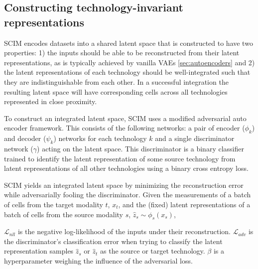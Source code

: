 \subsection{Constructing technology-invariant representations}
SCIM encodes datasets into a shared latent space that is constructed to have two properties:
1) the inputs should be able to be reconstructed from their latent representations, as is typically achieved by vanilla VAEs \ref{sec:autoencoders}
and 2) the latent representations of each technology should be well-integrated such that they are indistinguishable from each other.
In a successful integration the resulting latent space will have corresponding cells across all technologies represented in close proximity.

To construct an integrated latent space, SCIM uses a modified adversarial auto encoder framework.
This consists of the following networks: a pair of encoder ($\phi_k$) and decoder ($\psi_k$) networks for each technology $k$ and a single discriminator network ($\gamma$) acting on the latent space.
This discriminator is a binary classifier trained to identify the latent representation of some source technology from latent representations of all other technologies using a binary cross entropy loss.

SCIM yields an integrated latent space by minimizing the reconstruction error while adversarially fooling the discriminator.
Given the measurements of a batch of cells from the target modality $t$, $x_t$, and the (fixed) latent representations of a batch of cells from the source modality $s$, $\hat{z}_s \sim \phi_s(x_s)$,
\begin{equation}
  
  \label{eq:scim-loss}
\end{equation}

$\mathcal{L}_{nll}$ is the negative log-likelihood of the inputs under their reconstruction.
$\mathcal{L}_{adv}$ is the discriminator’s classification error when trying to classify the latent representation samples $\hat{z}_s$ or $\hat{z}_t$ as the source or target technology.
$\beta$ is a hyperparameter weighing the influence of the adversarial loss.

